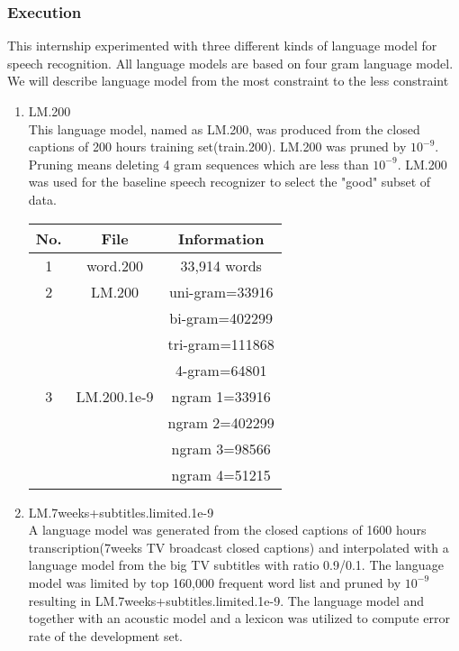 \subsubsection{Execution}
This internship experimented with three different kinds of language model for speech recognition. All language models are based on four gram language model. We will describe language model from the most constraint to the less constraint
\begin{enumerate}
\item LM.200 \\
This language model, named as LM.200, was produced from the closed captions of 200 hours training set(train.200). LM.200 was pruned by $10^{-9}$. Pruning means deleting 4 gram sequences which are less than $10^{-9}$.  LM.200 was used for the baseline speech recognizer to select the "good" subset of data.

\begin{center}
\begin{tabular}{ | c | c | c | }
\hline
\textbf{No.} & \textbf{File}  & \textbf{Information} \\ \hline \hline
1 & word.200 & 33,914 words \\  \hline
2 & LM.200 & uni-gram=33916 \\ 
 & & bi-gram=402299 \\ 
& & tri-gram=111868 \\  
& & 4-gram=64801 \\  \hline
3 & LM.200.1e-9 & ngram 1=33916 \\  
 & & ngram 2=402299 \\  
& & ngram 3=98566 \\  
& & ngram 4=51215 \\  \hline
\end{tabular}
\end{center}

\item LM.7weeks+subtitles.limited.1e-9 \\
A language model was generated from the closed captions of 1600 hours transcription(7weeks TV broadcast closed captions) and interpolated with a language model from the big TV subtitles with ratio 0.9/0.1. The language model was limited by top 160,000 frequent word list and pruned by $10^{-9}$ resulting in LM.7weeks+subtitles.limited.1e-9.  The language model and together with an acoustic model and a lexicon was utilized to compute error rate of the development set.


\end{enumerate}
